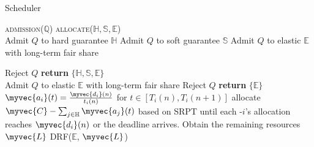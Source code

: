 \begin{algorithm}
	\small
\caption{\name Scheduler}
\label{algorithm1}
\begin{algorithmic}[1]
\State \textsc{admission}($\mathbb{Q}$)
\State \textsc{allocate}($\mathbb{H},\mathbb{S}, \mathbb{E}$)
\EndProcedure
\\
			\State Admit $Q$ to hard guarantee $\mathbb{H}$
		\Else
			\State Admit $Q$ to soft guarantee $\mathbb{S}$
		\EndIf
	\Else
		\State Admit $Q$ to elastic $\mathbb{E}$ with long-term fair share

	\EndIf
\Else 
	\State Reject $Q$
\EndIf
\EndFor
\State \textbf{return} $\{\mathbb{H},\mathbb{S},\mathbb{E}\}$	
\EndFunction
\\
		\State Admit $Q$ to elastic $\mathbb{E}$ with long-term fair share
	\Else 
		\State Reject $Q$
	\EndIf
\EndFor
\State \textbf{return} $\{\mathbb{E}\}$
\EndFunction
\\
\State $\myvec{a_i}(t)=\frac{\myvec{d_i}(n)}{t_i(n)}$ for $t\in[T_i(n),T_i(n+1)]$ %
\EndFor
{}
\State allocate $\myvec{C}-\sum_{j\in \mathbb{H}}\myvec{a_j}(t)$ based on SRPT until each {\burstq}-$i$'s allocation reaches $\myvec{d_i}(n)$ or the deadline arrives.
\EndFor
\State Obtain the remaining resources $\myvec{L}$
\State DRF($\mathbb{E}$, $\myvec{L}$)
\EndFunction
\end{algorithmic}
\end{algorithm}
